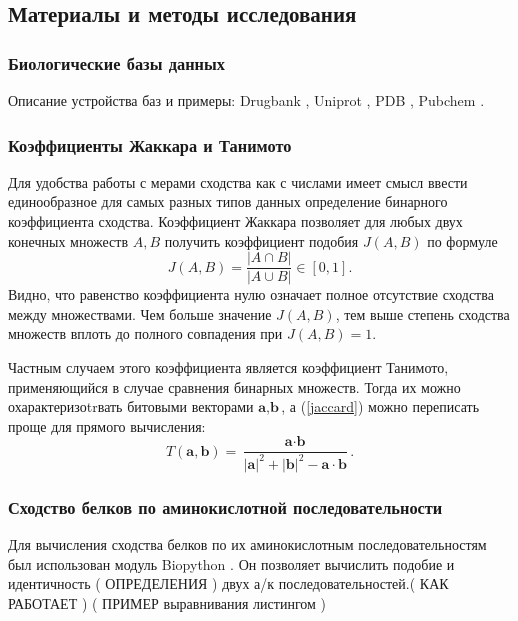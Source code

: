 \documentclass[a4paper,14pt]{article}         %
\begin{document}
\subsection{Материалы и методы исследования}
\subsubsection{Биологические базы данных}
\color{orange} Описание устройства баз и примеры: Drugbank \cite{drugbank}, Uniprot \cite{uniprot} , PDB \cite{pdb}, Pubchem \cite{pubchem}. \color{black}
\subsubsection{Коэффициенты Жаккара и Танимото}
Для удобства работы с мерами сходства как с числами имеет смысл ввести единообразное для самых разных типов данных определение бинарного коэффициента сходства. Коэффициент Жаккара \cite{Jaccard1901} позволяет для любых двух конечных множеств $A, B$ получить коэффициент подобия $J(A, B)$ по формуле
\begin{equation}
\label{jaccard}
J(A, B) = \frac{|A\cap B|}{|A\cup B|} \in [0, 1].
\end{equation}
Видно, что равенство коэффициента нулю означает полное отсутствие сходства между множествами. Чем больше значение $J(A, B)$, тем выше степень сходства множеств вплоть до полного совпадения при $J(A, B) = 1$.

Частным случаем этого коэффициента является коэффициент Танимото, применяющийся в случае сравнения бинарных множеств. Тогда их можно охарактеризоtrвать битовыми векторами $\textbf{a}, \textbf{b}$, а (\ref{jaccard}) можно переписать проще для прямого вычисления:
\begin{equation}
T(\textbf{a}, \textbf{b}) = \frac{\textbf{a}\cdot\textbf{b}}{|\textbf{a}|^2 + |\textbf{b}|^2 - \textbf{a}\cdot\textbf{b}}.
\end{equation}

\subsubsection{Сходство белков по аминокислотной последовательности}
Для вычисления сходства белков по их аминокислотным последовательностям был использован модуль Biopython \cite{biopython}. Он позволяет вычислить подобие и идентичность (\color{orange} ОПРЕДЕЛЕНИЯ \color{black}) двух а/к последовательностей.(\color{orange} КАК РАБОТАЕТ \color{black}) (\color{orange} ПРИМЕР выравнивания листингом \color{black}) 
\end{document}

